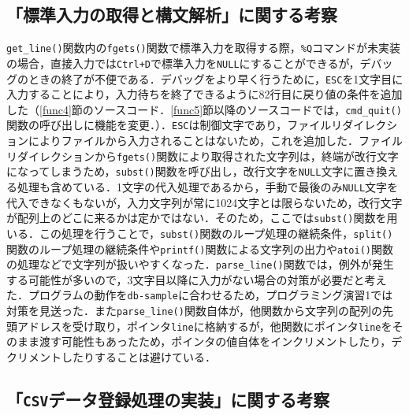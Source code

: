\subsection{「標準入力の取得と構文解析」に関する考察}

\verb|get_line()|関数内の\verb|fgets()|関数で標準入力を取得する際，\verb|%Q|コマンドが未実装の場合，直接入力では\verb|Ctrl+D|で標準入力を\verb|NULL|にすることができるが，デバッグのときの終了が不便である．デバッグをより早く行うために，\verb|ESC|を1文字目に入力することにより，入力待ちを終了できるように82行目に戻り値の条件を追加した（\ref{func4}節のソースコード．\ref{func5}節以降のソースコードでは，\verb|cmd_quit()|関数の呼び出しに機能を変更．）．\verb|ESC|は制御文字であり，ファイルリダイレクションによりファイルから入力されることはないため，これを追加した\cite{www:label2}．ファイルリダイレクションから\verb|fgets()|関数により取得された文字列は，終端が改行文字になってしまうため，\verb|subst()|関数を呼び出し，改行文字を\verb|NULL|文字に置き換える処理も含めている．1文字の代入処理であるから，手動で最後のみ\verb|NULL|文字を代入できなくもないが，入力文字列が常に1024文字とは限らないため，改行文字が配列上のどこに来るかは定かではない．そのため，ここでは\verb|subst()|関数を用いる．この処理を行うことで，\verb|subst()|関数のループ処理の継続条件，\verb|split()|関数のループ処理の継続条件や\verb|printf()|関数による文字列の出力や\verb|atoi()|関数の処理などで文字列が扱いやすくなった．\verb|parse_line()|関数では，例外が発生する可能性が多いので，3文字目以降に入力がない場合の対策が必要だと考えた．プログラムの動作を\verb|db-sample|に合わせるため，プログラミング演習1では対策を見送った．また\verb|parse_line()|関数自体が，他関数から文字列の配列の先頭アドレスを受け取り，ポインタ\verb|line|に格納するが，他関数にポインタ\verb|line|をそのまま渡す可能性もあったため，ポインタの値自体をインクリメントしたり，デクリメントしたりすることは避けている．

\subsection{「\texttt{CSV}データ登録処理の実装」に関する考察}

